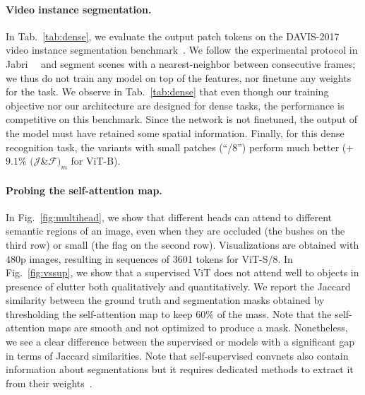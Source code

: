 \paragraph{Video instance segmentation.}
In Tab.~\ref{tab:dense}, we evaluate the output patch tokens on the DAVIS-2017 video instance segmentation benchmark~\cite{pont20172017}.
We follow the experimental protocol in Jabri~\etal~\cite{jabri2020space} and segment scenes with a nearest-neighbor between consecutive frames; we thus do not train any model on top of the features, nor finetune any weights for the task.
We observe in Tab.~\ref{tab:dense} that even though our training objective nor our architecture are designed for dense tasks, the performance is competitive on this benchmark.
Since the network is not finetuned, the output of the model must have retained some spatial information.
Finally, for this dense recognition task, the variants with small patches (``/8'') perform much better (+$9.1\%$ $(\mathcal{J}$\&$\mathcal{F})_m$ for ViT-B).

\paragraph{Probing the self-attention map.}
In Fig.~\ref{fig:multihead}, we show that different heads can attend to different semantic regions of an image,  even when they are occluded (the bushes on the third row) or small (the flag on the second row).
Visualizations are obtained with $480$p images, resulting in sequences of 3601 tokens for ViT-S/8.
In Fig.~\ref{fig:vssup}, we show that a supervised ViT does not attend well to objects in presence of clutter both qualitatively and quantitatively.
We report the Jaccard similarity between the ground truth and segmentation masks obtained by thresholding the self-attention map to keep 60\% of the mass.
Note that the self-attention maps are smooth and not optimized to produce a mask. 
Nonetheless, we see a clear difference between the supervised or \OURS models with a significant gap in terms of Jaccard similarities.
Note that self-supervised convnets also contain information about segmentations but it requires dedicated methods to extract it from their weights~\cite{gur2020visualization}.

